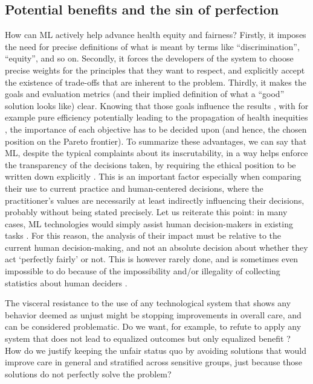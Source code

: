 \subsection{Potential benefits and the sin of perfection}
    How can ML actively help advance health equity and fairness?
    Firstly, it imposes the need for precise definitions of what is meant by terms like ``discrimination'', ``equity'', and so on.
    Secondly, it forces the developers of the system to choose precise weights for the principles that they want to respect, and explicitly accept the existence of trade-offs that are inherent to the problem.
    Thirdly, it makes the goals and evaluation metrics (and their implied definition of what a ``good'' solution looks like) clear.
    Knowing that those goals influence the results \cite{Dijkstra2020}, with for example pure efficiency potentially leading to the propagation of health inequities \cite[p.~2]{Rajkomar2018}, the importance of each objective has to be decided upon (and hence, the chosen position on the Pareto frontier).
    To summarize these advantages, we can say that ML, despite the typical complaints about its inscrutability, in a way helps enforce the transparency of the decisions taken, by requiring the ethical position to be written down explicitly \cite{Williamson2021}.
    This is an important factor especially when comparing their use to current practice and human-centered decisions, where the practitioner's values are necessarily at least indirectly influencing their decisions, probably without being stated precisely.
    Let us reiterate this point: in many cases, ML technologies would simply assist human decision-makers in existing tasks \cite[p.~2]{Morley2020}.
    For this reason, the analysis of their impact must be relative to the current human decision-making, and not an absolute decision about whether they act `perfectly fairly' or not.
    This is however rarely done, and is sometimes even impossible to do because of the impossibility and/or illegality of collecting statistics about human deciders \cite{Williamson2021}.


    The visceral resistance to the use of any technological system that shows any behavior deemed as unjust might be stopping improvements in overall care, and can be considered problematic.
    Do we want, for example, to refute to apply any system that does not lead to equalized outcomes but only equalized benefit \cite[p.~5]{Rajkomar2018}?
    How do we justify keeping the unfair status quo by avoiding solutions that would improve care in general and stratified across sensitive groups, just because those solutions do not perfectly solve the problem?

